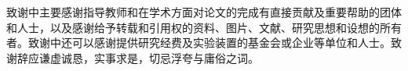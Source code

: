 \acknowledgments

致谢中主要感谢指导教师和在学术方面对论文的完成有直接贡献及重要帮助的团体和人士，以及感谢给予转载和引用权的资料、图片、文献、研究思想和设想的所有者。致谢中还可以感谢提供研究经费及实验装置的基金会或企业等单位和人士。致谢辞应谦虚诚恳，实事求是，切忌浮夸与庸俗之词。
